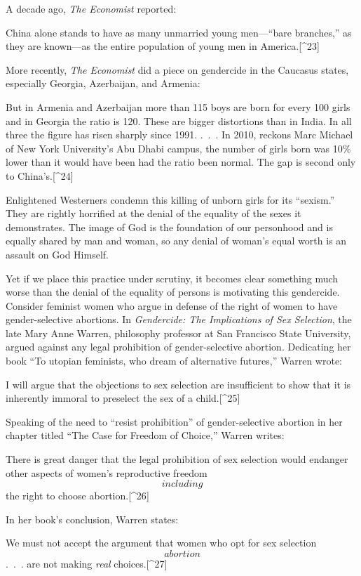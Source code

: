 \documentclass[
]{book}
\begin{document}
A decade ago, \emph{The Economist} reported:

China alone stands to have as many unmarried young men---``bare branches,'' as they are known---as the entire population of young men in America.{[}\^{}23{]}

More recently, \emph{The Economist} did a piece on gendercide in the Caucasus states, especially Georgia, Azerbaijan, and Armenia:

But in Armenia and Azerbaijan more than 115 boys are born for every 100 girls and in Georgia the ratio is 120. These are bigger distortions than in India. In all three the figure has risen sharply since 1991. .~.~. In 2010, reckons Marc Michael of New York University's Abu Dhabi campus, the number of girls born was 10\% lower than it would have been had the ratio been normal. The gap is second only to China's.{[}\^{}24{]}

Enlightened Westerners condemn this killing of unborn girls for its ``sexism.'' They are rightly horrified at the denial of the equality of the sexes it demonstrates. The image of God is the foundation of our personhood and is equally shared by man and woman, so any denial of woman's equal worth is an assault on God Himself.

Yet if we place this practice under scrutiny, it becomes clear something much worse than the denial of the equality of persons is motivating this gendercide. Consider feminist women who argue in defense of the right of women to have gender-selective abortions. In \emph{Gendercide: The Implications of Sex Selection}, the late Mary Anne Warren, philosophy professor at San Francisco State University, argued against any legal prohibition of gender-selective abortion. Dedicating her book ``To utopian feminists, who dream of alternative futures,'' Warren wrote:

I will argue that the objections to sex selection are insufficient to show that it is inherently immoral to preselect the sex of a child.{[}\^{}25{]}

Speaking of the need to ``resist prohibition'' of gender-selective abortion in her chapter titled ``The Case for Freedom of Choice,'' Warren writes:

There is great danger that the legal prohibition of sex selection would endanger other aspects of women's reproductive freedom \[including\] the right to choose abortion.{[}\^{}26{]}

In her book's conclusion, Warren states:

We must not accept the argument that women who opt for sex selection \[abortion\] .~.~. are not making \emph{real} choices.{[}\^{}27{]}
\end{document}

